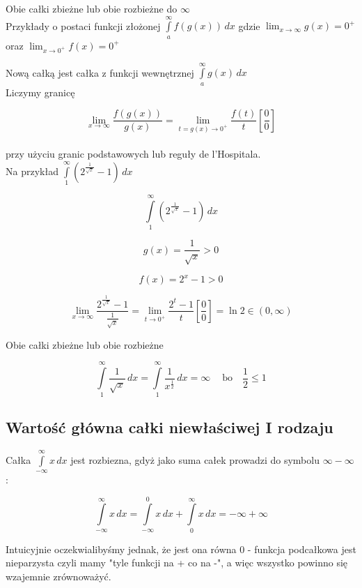 Obie całki zbieżne lub obie rozbieżne do $\infty$ \\

Przykłady o postaci funkcji złożonej $ \int\limits_{a}^{\infty} f(g(x)) \,dx $
gdzie $ \lim_{x \to \infty} g(x) = 0^+ $ oraz $ \lim_{x \to 0^+} f(x) = 0^+ $

Nową całką jest całka z funkcji wewnętrznej $ \int\limits_{a}^{\infty} g(x) \,dx $ \\

Liczymy granicę

$$ \lim_{x \to \infty} \frac{f(g(x))}{g(x)} = \lim_{t = g(x) \to 0^+} \frac{f(t)}{t} \left[ \frac{0}{0} \right] $$ \\

przy użyciu granic podstawowych lub reguły de l'Hospitala. \\

Na przykład $ \int\limits_{1}^{\infty} \left( 2^{\frac{1}{\sqrt{x}}} - 1 \right) \,dx$

$$ \int\limits_{1}^{\infty} \left( 2^{\frac{1}{\sqrt{x}}} - 1 \right) \,dx $$

$$ g(x) = \frac{1}{\sqrt{x}} > 0 $$

$$ f(x) = 2^x - 1 > 0 $$

$$ \lim_{x \to \infty} \frac{2^{\frac{1}{\sqrt{x}}} - 1}{\frac{1}{\sqrt{x}}} = \lim_{t \to 0^+} \frac{2^t - 1}{t}
\left[ \frac{0}{0} \right] = \ln 2 \in (0, \infty) $$

Obie całki zbieżne lub obie rozbieżne

$$ \int\limits_1^\infty \frac{1}{\sqrt{x}} \,dx = \int\limits_1^\infty \frac{1}{x^{\frac{1}{2}}} \,dx = \infty\ \quad
\textrm{bo} \quad \frac{1}{2} \leq 1 $$

\subsection*{Wartość główna całki niewłaściwej I rodzaju}

Całka $ \int\limits_{-\infty}^{\infty} x \,dx $ jest rozbiezna, gdyż jako suma całek prowadzi do symbolu $ \infty - \infty $:

$$ \int\limits_{-\infty}^{\infty} x \,dx = \int\limits_{-\infty}^{0} x \,dx + \int\limits_{0}^{\infty} x \,dx = -\infty + \infty $$

Intuicyjnie oczekwialibyśmy jednak, że jest ona równa 0 - funkcja podcałkowa jest nieparzysta czyli mamy "tyle funkcji
na + co na -", a więc wszystko powinno się wzajemnie zrównoważyć.

